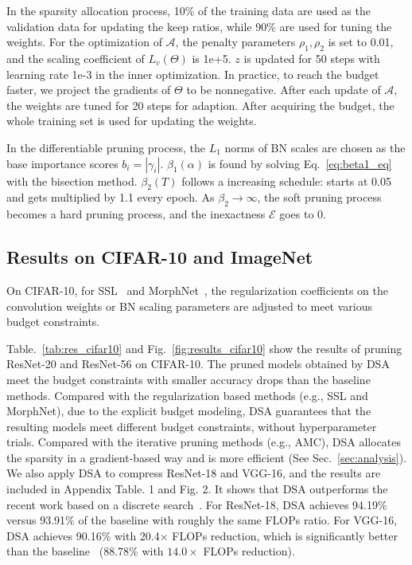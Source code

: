 \documentclass[runningheads]{llncs}
\newcommand{\inexactness}{\mathcal{E}}
\newcommand{\alphas}{\mathcal{A}}
\newcommand{\invas}{\Theta}
\newcommand{\dsa}{DSA\xspace}
\begin{document}
  In the sparsity allocation process, 10\% of the training data are used as the validation data for updating the keep ratios, while 90\% are used for tuning the weights. For the optimization of $\alphas$, the penalty parameters $\rho_1, \rho_2$ is set to 0.01, and the scaling coefficient of $L_v(\invas)$ is 1e+5. $z$ is updated for 50 steps with learning rate 1e-3 in the inner optimization. In practice, to reach the budget faster, we project the gradients of $\invas$ to be nonnegative. After each update of $\alphas$, the weights are tuned for 20 steps for adaption. After acquiring the budget, the whole training set is used for updating the weights. 
  
  In the differentiable pruning process, the $L_1$ norms of BN scales are chosen as the base importance scores $b_i =|\gamma_i|$. $\beta_1(\alpha)$ is found by solving Eq.~\ref{eq:beta1_eq} with the bisection method. 
  $\beta_2(T)$ follows a increasing schedule: starts at 0.05 and gets multiplied by 1.1 every epoch. As $\beta_2 \to \infty$, the soft pruning process becomes a hard pruning process, and the inexactness $\inexactness$ goes to $0$.
  
  \subsection{Results on CIFAR-10 and ImageNet}
  
  On CIFAR-10,
  for SSL~\cite{grouplasso} and MorphNet~\cite{morphnet}, the regularization coefficients on the convolution weights or BN scaling parameters are adjusted to meet various budget constraints.

  
  Table.~\ref{tab:res_cifar10} and Fig.~\ref{fig:results_cifar10} show the results of pruning ResNet-20 and ResNet-56 on CIFAR-10. The pruned models obtained by \dsa meet the budget constraints with smaller accuracy drops than the baseline methods. 
  Compared with the regularization based methods (e.g., SSL and MorphNet), due to the explicit budget modeling, \dsa guarantees that the resulting models meet different budget constraints, without hyperparameter trials. Compared with the iterative pruning methods (e.g., AMC), DSA allocates the sparsity in a gradient-based way and is more efficient (See Sec.~\ref{sec:analysis}).
  We also apply \dsa to compress ResNet-18 and VGG-16, and the results are included in Appendix Table. 1 and Fig. 2. It shows that DSA outperforms the recent work based on a discrete search~\cite{autocompress}. For ResNet-18, \dsa achieves 94.19\% versus 93.91\% of the baseline with roughly the same FLOPs ratio. For VGG-16, \dsa achieves 90.16\% with 20.4$\times$ FLOPs reduction, which is significantly better than the baseline~\cite{autocompress} (88.78\% with $14.0\times$ FLOPs reduction).
  
\end{document}
